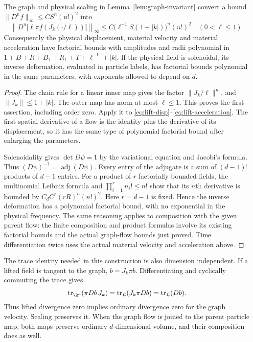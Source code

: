 \begin{lemma}\label{lem:physical-labels}
The graph and physical scaling in Lemma~\ref{lem:graph-invariant}
convert a bound $\|D^n f\|_\infty\leq C S^n(n!)^2$ into
\[
 \left\|D^n\bigl[\ell\pi f(J_k(\cdot/\ell))\bigr]\right\|_\infty
 \leq C\bigl(\ell^{-1}S(1+|k|)\bigr)^n(n!)^2
 \quad(0<\ell\leq1).
\]
Consequently the physical displacement, material velocity and material
acceleration have factorial bounds with amplitudes and radii polynomial
in $1+B+R+B_1+R_1+T+\ell^{-1}+|k|$. If the physical field is
solenoidal, its inverse deformation, evaluated in particle labels, has
factorial bounds polynomial in
the same parameters, with exponents allowed to depend on $d$.
\end{lemma}
\begin{proof}
The chain rule for a linear inner map gives the factor
$\|J_k/\ell\|^n$, and $\|J_k\|\leq1+|k|$. The outer map has norm at
most $\ell\leq1$. This proves the first assertion, including order
zero. Apply it to \eqref{eq:lift-disp}--\eqref{eq:lift-acceleration}.
The first spatial derivative of a flow is the identity plus the
derivative of its displacement, so it has the same type of polynomial
factorial bound after enlarging the parameters.

Solenoidality gives $\det D\psi=1$ by the variational equation and
Jacobi's formula. Thus $(D\psi)^{-1}=\operatorname{adj}(D\psi)$.
Every entry of the adjugate is a sum of $(d-1)!$ products of $d-1$
entries. For a product of $r$ factorially bounded fields, the
multinomial Leibniz formula and
$\prod_{i=1}^r n_i!\leq n!$ show that its $n$th derivative is bounded
by $C_d C^r(rR)^n(n!)^2$. Here $r=d-1$ is fixed.
Hence the inverse deformation has a polynomial factorial bound, with
no exponential in the physical frequency. The same reasoning applies
to composition with the given parent flow: the finite composition and
product formulas involve its existing factorial bounds and the actual
graph-flow bounds just proved. Time differentiation twice uses the
actual material velocity and acceleration above.
\end{proof}

The trace identity needed in this construction is also
dimension independent. If a lifted field is tangent to the graph,
$b=J_k\pi b$. Differentiating and cyclically commuting the trace gives
\[
 \operatorname{tr}_{\R^d}(\pi Db\,J_k)
   =\operatorname{tr}_{\mathcal L}(J_k\pi Db)
   =\operatorname{tr}_{\mathcal L}(Db).
\]
Thus lifted divergence zero implies ordinary divergence zero for the
graph velocity. Scaling preserves it. When the graph flow is joined
to the parent particle map, both maps preserve ordinary $d$-dimensional
volume, and their composition does as well.


